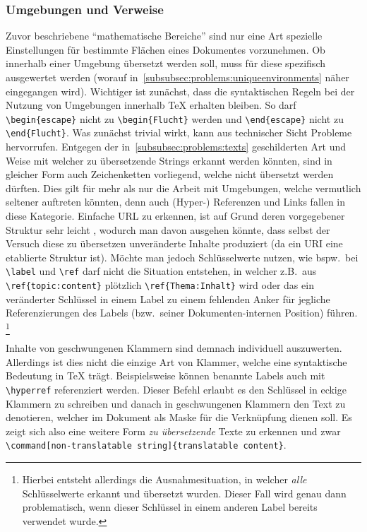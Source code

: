 \subsubsection{Umgebungen und Verweise}
Zuvor beschriebene \enquote{mathematische Bereiche} sind nur eine Art spezielle Einstellungen für bestimmte Flächen eines Dokumentes vorzunehmen. Ob innerhalb einer Umgebung übersetzt werden soll, muss für diese spezifisch ausgewertet werden (worauf in~\ref{subsubsec:problems:uniqueenvironments} näher eingegangen wird). Wichtiger ist zunächst, dass die syntaktischen Regeln bei der Nutzung von Umgebungen innerhalb \TeX{} erhalten bleiben. So darf \verb|\begin{escape}| nicht zu \verb|\begin{Flucht}| werden und \verb|\end{escape}| nicht zu \verb|\end{Flucht}|. 
Was zunächst trivial wirkt, kann aus technischer Sicht Probleme hervorrufen. Entgegen der in~\ref{subsubsec:problems:texts} geschilderten Art und Weise mit welcher zu übersetzende Strings erkannt werden könnten, sind in gleicher Form auch Zeichenketten vorliegend, welche nicht übersetzt werden dürften. Dies gilt für mehr als nur die Arbeit mit Umgebungen, welche vermutlich seltener auftreten könnten, denn auch (Hyper-) Referenzen und Links fallen in diese Kategorie. Einfache URL zu erkennen, ist auf Grund deren vorgegebener Struktur sehr leicht 
, wodurch man davon ausgehen könnte, dass selbst der Versuch diese zu übersetzen unveränderte Inhalte produziert (da ein URI eine etablierte Struktur ist). Möchte man jedoch Schlüsselwerte nutzen, wie bspw.\ bei \verb|\label| und \verb|\ref| darf nicht die Situation entstehen, in welcher z.B.\ aus \verb|\ref{topic:content}| plötzlich \verb|\ref{Thema:Inhalt}| wird oder das ein veränderter Schlüssel in einem Label zu einem fehlenden Anker für jegliche Referenzierungen des Labels (bzw.\ seiner Dokumenten-internen Position) führen.
\footnote{Hierbei entsteht allerdings die Ausnahmesituation, in welcher \textit{alle} Schlüsselwerte erkannt und übersetzt wurden. Dieser Fall wird genau dann problematisch, wenn dieser Schlüssel in einem anderen Label bereits verwendet wurde.}

Inhalte von geschwungenen Klammern sind demnach individuell auszuwerten. Allerdings ist dies nicht die einzige Art von Klammer, welche eine syntaktische Bedeutung in \TeX{} trägt. Beispielsweise können benannte Labels auch mit \verb|\hyperref| referenziert werden. Dieser Befehl erlaubt es den Schlüssel in eckige Klammern zu schreiben und danach in geschwungenen Klammern den Text zu denotieren, welcher im Dokument als Maske für die Verknüpfung dienen soll. 
Es zeigt sich also eine weitere Form \textit{zu übersetzende} Texte zu erkennen und zwar \verb|\command[non-translatable string]{translatable content}|.

